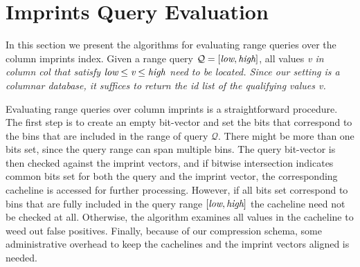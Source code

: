 \section{Imprints Query Evaluation}\label{sec:operators}

In this section we present the algorithms for evaluating range queries over the
column imprints index. Given a range query
$\mathcal{Q}=[\it{low},\it{high}]$, all values \it{v} in column \it{col} that
satisfy $\it{low}\leq\it{v}\leq\it{high}$ need to be located. Since our
setting is a columnar database, it suffices to return the \it{id} list
of the qualifying values \it{v}.

Evaluating range queries over column imprints is a straightforward procedure.
The first step is to create an empty bit-vector and set the bits that
correspond to the bins that are included in the range of query $\mathcal{Q}$.
There might be more than one bits set, since the query range can span
multiple bins. The query bit-vector is then checked against the imprint
vectors, and if bitwise intersection indicates common bits set for both the
query and the imprint vector, the corresponding cacheline is accessed for
further processing. However, if all bits set correspond to bins that are fully
included in the query range $[\it{low},\it{high}]$ the cacheline need not
be checked at all. Otherwise, the algorithm examines all values in the
cacheline to weed out false positives. Finally, because of our compression
schema, some administrative overhead to keep the cachelines and the imprint
vectors aligned is needed.

